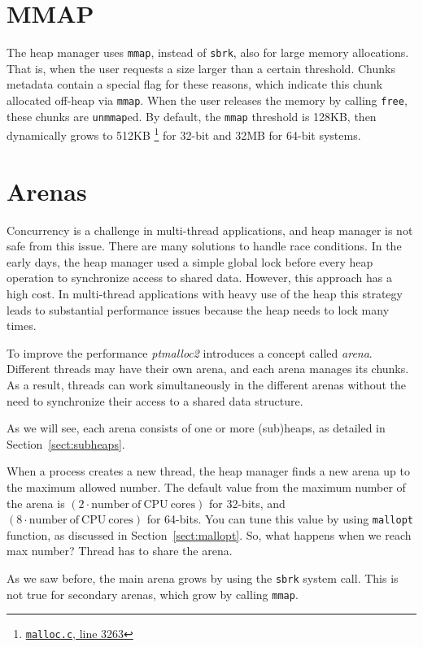 \documentclass{masterthesis}
\newcommand*\mmapc{\lstinline{mmap}\xspace}
\newcommand*\sbrkc{\lstinline{sbrk}\xspace}
\newcommand{\refToSection}[1]{Section~\ref{sect:#1}\xspace}
\begin{document}
\section{MMAP}
The heap manager uses \mmapc{}, instead of \sbrkc, also for large memory allocations. That is, when the user requests a size larger than a certain threshold. Chunks metadata contain a special flag for these reasons, which indicate this chunk allocated off-heap via \mmapc{}. When the user releases the memory by calling \lstinline{free}, these chunks are \lstinline{unmmap}ed. By default, the \mmapc{} threshold is 128KB, then dynamically grows to 512KB \footnote{\href{https://sourceware.org/git/?p=glibc.git;a=blob;f=malloc/malloc.c;\#l3263}{\texttt{malloc.c}, line 3263}} for 32-bit and 32MB for 64-bit systems.

\section{Arenas}
Concurrency is a challenge in multi-thread applications, and heap manager is not safe from this issue. There are many solutions to handle race conditions. In the early days, the heap manager used a simple global lock before every heap operation to synchronize access to shared data. However, this approach has a high cost. In multi-thread applications with heavy use of the heap this strategy leads to substantial performance issues because the heap needs to lock many times.

To improve the performance \emph{ptmalloc2} introduces a concept called \emph{arena}. Different threads may have their own arena, and each arena manages its chunks. As a result, threads can work simultaneously in the different arenas without the need to synchronize their access to a shared data structure.

As we will see, each arena consists of one or more (sub)heaps, as detailed in \refToSection{subheaps}.

When a process creates a new thread, the heap manager finds a new arena up to the maximum allowed number. The default value from the maximum number of the arena is $(2\cdot\mathrm{number\ of\ CPU\ cores})$ for 32-bits, and $(8\cdot\mathrm{number\ of\ CPU\ cores})$ for 64-bits. You can tune this value by using \lstinline{mallopt} function, as discussed in \refToSection{mallopt}. So, what happens when we reach max number? Thread has to share the arena.

As we saw before, the main arena grows by using the \sbrkc system call. This is not true for secondary arenas, which grow by calling \mmapc{}.
\end{document}
